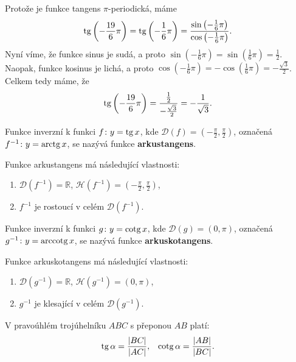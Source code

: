 \begin{reseni}
	Protože je funkce tangens $\pi$-periodická, máme
	$$
	    \operatorname{tg} \left ( -\frac{19}{6}\pi \right ) = \operatorname{tg} \left ( -\frac{1}{6}\pi \right ) = \frac{\sin \left ( -\frac{1}{6}\pi \right )}{\cos \left ( -\frac{1}{6}\pi \right )}.
	$$
	Nyní víme, že funkce sinus je sudá, a proto $\sin \left ( -\frac{1}{6}\pi \right ) = \sin\left ( \frac{1}{6}\pi \right )=\frac{1}{2}$.
	Naopak, funkce kosinus je lichá, a proto $\cos \left ( -\frac{1}{6}\pi \right ) = -\cos \left ( \frac{1}{6}\pi \right )=-\frac{\sqrt{3}}{2}$.
	Celkem tedy máme, že
	$$
	    \operatorname{tg} \left ( -\frac{19}{6}\pi \right )=\frac{\frac{1}{2}}{-\frac{\sqrt{3}}{2}}=-\frac{1}{\sqrt{3}}.
	$$
\end{reseni}

\begin{definition}
  Funkce inverzní k funkci $f\colon y=\operatorname{tg} x$, kde $\mathcal D(f)=\left ( -\frac{\pi}{2}, \frac{\pi}{2} \right )$, označená $f^{-1}\colon y=\operatorname{arctg} x$, se nazývá funkce \textbf{arkustangens}.
\end{definition}

\begin{pozn}
Funkce arkustangens má následující vlastnosti:
\begin{enumerate}
\item $\mathcal D(f^{-1}) = \mathbb{R}$, $\mathcal H(f^{-1}) = \left ( -\frac{\pi}{2}, \frac{\pi}{2} \right )$,
\item $f^{-1}$ je rostoucí v celém $\mathcal D(f^{-1})$.
\end{enumerate}
\end{pozn}

\begin{definition}
  Funkce inverzní k funkci $g\colon y=\operatorname{cotg} x$, kde $\mathcal D(g)=\left ( 0, \pi \right )$, označená $g^{-1}\colon y=\operatorname{arccotg} x$, se nazývá funkce \textbf{arkuskotangens}.
\end{definition}

\begin{pozn}
Funkce arkuskotangens má následující vlastnosti:
\begin{enumerate}
\item $\mathcal D(g^{-1}) = \mathbb{R}$, $\mathcal H(g^{-1}) = \left ( 0, \pi \right )$,
\item $g^{-1}$ je klesající v celém $\mathcal D(g^{-1})$.
\end{enumerate}
\end{pozn}

\begin{veta}
    V pravoúhlém trojúhelníku $ABC$ s přeponou $AB$ platí:
    \begin{align*}
        \operatorname{tg} \alpha = \frac{ |BC| }{ |AC| }, & & \operatorname{cotg} \alpha = \frac{|AB|}{|BC|}.
    \end{align*}
\end{veta}
